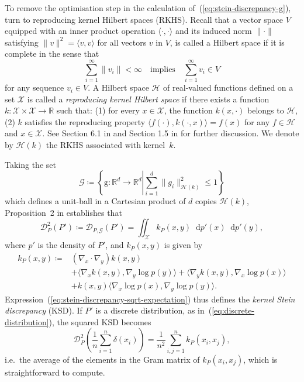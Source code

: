 \documentclass[11pt,a4paper]{report}
\newcommand*\diff{\mathop{}\!\mathrm{d}}
\begin{document}
To remove the optimisation step in the calculation of~(\ref{eq:stein-discrepancy-g}), \cite{gorhamMeasuringSampleQuality2017} turn to reproducing kernel Hilbert spaces (RKHS). Recall that a vector space $V$ equipped with an inner product operation $\langle \cdot, \cdot \rangle$ and its induced norm $\|\cdot\|$ satisfying $\|v\|^2 = \langle v, v \rangle$ for all vectors $v$ in $V$, is called a Hilbert space if it is complete in the sense that
\begin{equation*}
\sum_{i=1}^\infty \|v_i\| < \infty \quad \text{implies} \quad \sum_{i=1}^\infty v_i \in V
\end{equation*}
for any sequence $v_i \in V$. A Hilbert space $\mathcal{H}$ of real-valued functions defined on a set $\mathcal{X}$ is called a \textit{reproducing kernel Hilbert space} if there exists a function $k: \mathcal{X} \times \mathcal{X} \to \mathbb{R}$ such that: (1) for every $x \in \mathcal{X}$, the function $k(x, \cdot)$ belongs to $\mathcal{H}$, (2) $k$ satisfies the reproducing property $\langle f(\cdot), k(\cdot, x)\rangle = f(x)$ for any $f \in \mathcal{H}$ and $x \in \mathcal{X}$. See Section 6.1 in \cite{rasmussenGaussianProcessesMachine2006} and Section 1.5 in \cite{fearnheadScalableMonteCarlo2024} for further discussion. We denote by $\mathcal{H}(k)$ the RKHS associated with kernel~$k$.

Taking the set
\begin{equation}
\mathcal{G} \coloneq \left\{ \mathrm{g} : \mathbb{R}^d \to \mathbb{R}^d \left| \sum_{i=1}^d \|g_i\|^2_{\mathcal{H}(k)} \leq 1 \right.\right\}
\label{eq:unit-ball}
\end{equation}
which defines a unit-ball in a Cartesian product of $d$ copies $\mathcal{H}(k)$, Proposition~2 in \cite{gorhamMeasuringSampleQuality2017} establishes that
\begin{equation}
\mathcal{D}_{P}^2(P') \coloneq \mathcal{D}_{P, \mathcal{G}}(P') = \iint_\mathcal{X} k_P(x, y) \diff p'(x) \diff p'(y),
\label{eq:stein-discrepancy-sqrt-expectation}
\end{equation}
where $p'$ is the density of $P'$, and $k_P(x, y)$ is given by
\begin{equation}
\begin{aligned}
k_P(x, y) \coloneq 
&(\nabla_x\cdot\nabla_y) k(x,y) \\
&+ \langle \nabla_x k(x, y), \nabla_y \log p(y) \rangle + \langle \nabla_y k(x, y), \nabla_x \log p(x) \rangle \\
&+ k(x, y) \langle \nabla_x \log p(x), \nabla_y \log p(y) \rangle.
\label{eq:deriv:stein-kernel}
\end{aligned}
\end{equation}
Expression~(\ref{eq:stein-discrepancy-sqrt-expectation}) thus defines the \textit{kernel Stein discrepancy} (KSD).
If $P'$ is a discrete distribution, as in~(\ref{eq:discrete-distribution}), the squared KSD becomes
\begin{equation}
\mathcal{D}_{P}^2\left(\frac{1}{n} \sum_{i=1}^n \delta(x_i)\right) = \frac{1}{n^2} \sum_{i,j=1}^n k_P(x_i, x_j),
\label{eq:ksd:discrete}
\end{equation}
i.e.\ the average of the elements in the Gram matrix of $k_P(x_i, x_j)$, which is straightforward to compute.
\end{document}
